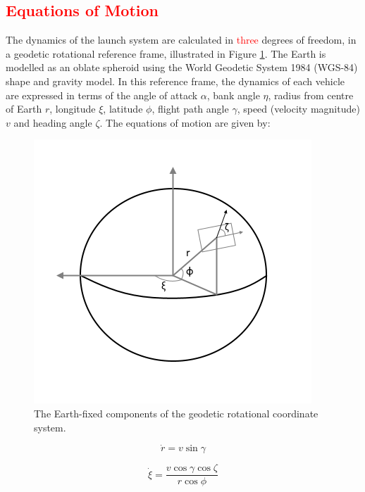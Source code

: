 \textcolor{red}{
\subsection{Equations of Motion}
}
\noindent
The dynamics of the launch system are calculated in \textcolor{red}{three} degrees of freedom, in a geodetic rotational reference frame, illustrated in Figure \ref{fig:global}. The Earth is modelled as an oblate spheroid using the World Geodetic System 1984\cite{Icao2002} (WGS-84) shape and gravity model. In this reference frame, the dynamics of each vehicle are expressed in terms of the angle of attack $\alpha$, bank angle $\eta$, radius from centre of Earth $r$, longitude $\xi$, latitude $\phi$, flight path angle $\gamma$, speed (velocity magnitude) $v$ and heading angle $\zeta$. The equations of motion are given by\cite{Maddock2017,Tewari2007}:
\begin{figure}[ht]
	\centering
	\includegraphics[width=0.7\linewidth]{figures/4_LODESTAR/global}
	\caption{The Earth-fixed components of the geodetic rotational coordinate system.}
	\label{fig:global}
\end{figure}


\begin{equation}
\dot{r} = v \sin \gamma
\end{equation}

\begin{equation}
\dot{\xi} = \frac{v\cos \gamma \cos \zeta}{r \cos \phi}
\end{equation}

